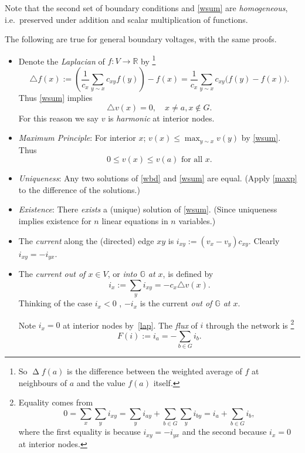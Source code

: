 \documentclass[a4paper]{amsart}
\theoremstyle{plain}
\theoremstyle{definition}
\theoremstyle{remark}
\DeclareMathOperator{\lap}{\Delta}
\begin{document}
  Note that the second set of boundary conditions and \eqref{wsum} are \emph{homogeneous}, i.e.\ preserved under addition and scalar multiplication of functions. 

\medskip
The following are true for general boundary voltages, with the same proofs.
\begin{itemize}

\item Denote the \emph{Laplacian} of   $ f: V \to \mathbb{R} $  by%
\footnote{So $ \lap f (a)$ is the difference between the weighted average of $ f $ at neighbours of $ a $ and the value $ f(a) $ itself.}
\begin{equation} \label{dlap}    
\boxed{
\triangle f(x) := \left( \frac{1}{c_x} \sum_{y\sim x} c_{xy}f(y) \right) - f(x) =  \frac{1}{c_x} \sum_{y\sim x} c_{xy}\big( f(y) - f(x) \big).
}
\end{equation} 
Thus \eqref{wsum} implies 
\begin{equation} \label{lap}
 \triangle v(x) = 0,   \quad x\neq a, x \not\in  G.
\end{equation} 
For this reason we say $ v $ is  \emph{harmonic}  at interior nodes.

\item \emph{Maximum Principle}:   For interior $  x  $;  $ v(x) \leq \max_{y\sim x} v(y) $ 
by \eqref{wsum}.  Thus 
\begin{equation} \label{maxp}
 0 \leq   v(x) \leq v(a) \text{ for all } x.
\end{equation}

\item \emph{Uniqueness}: Any two solutions of \eqref{wbd} and \eqref{wsum} are equal. 
 (Apply \eqref{maxp} to the difference of  the solutions.) 

\item \emph{Existence}: There \emph{exists} a (unique) solution of \eqref{wsum}. 
(Since uniqueness implies existence for $ n $ linear equations in $ n $ variables.)

\item  The \emph{current} along the (directed) edge   $x y $ is $ i_{xy} :=(v_x-v_y) c_{xy}$. Clearly $ i_{xy} = -i_{yx} $.

\item The \emph{current out of $ x \in V $}, or \emph{into $   \mathbb{G}  $ at $ x $}, is defined by
\begin{equation} \label{ilap} 
\boxed{
i_x := \sum_y i_{xy} = -c_x \triangle v(x).
}
\end{equation} 
Thinking of the case $ i_x< 0 $ ,   $ -i_x $ is the current  \emph{out of $ \mathbb{G} $ at $ x $}.
 
Note $ i_x = 0 $ at interior nodes by~\eqref{lap}. The  \emph{flux} of $ i $ through the network is%
\footnote{\label{fnequ}
Equality comes from
\[
0 = \sum_x \sum_y i_{xy}  
   = \sum_y i_{ay} + \sum_{b\in G}\sum_y i_{by}    =i_a +\sum_{b\in G} i_b,
\]
where the first equality is because $ i_{xy} = -i_{yx} $ and the second because $ i_x=0 $ at interior nodes.
}
\begin{equation} \label{flx}  
F(i) := i_a = -\sum_{b\in G} i_b.
\end{equation} 
\end{itemize}
\end{document}

